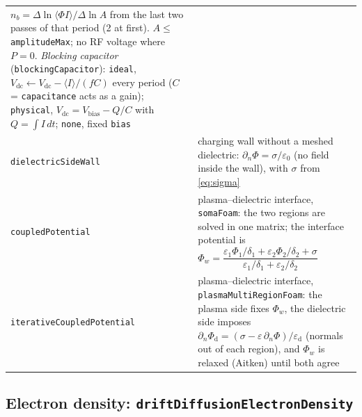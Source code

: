 \documentclass[11pt,a4paper]{article}
\newcommand{\kw}[1]{\texttt{#1}}
\begin{document}
\begin{longtable}{@{}L{4.9cm}L{10.3cm}@{}}
  $n_b=\Delta\ln\langle\Phi I\rangle/\Delta\ln A$ from the last two
  passes of that period (2 at first).
  $A\le{}$\kw{amplitudeMax}; no RF voltage where $P=0$.\newline
  \emph{Blocking capacitor} (\kw{blockingCapacitor}): \kw{ideal},
  $V_\mathrm{dc}\leftarrow V_\mathrm{dc}-\langle I\rangle/(fC)$ every period
  ($C$ = \kw{capacitance} acts as a gain); \kw{physical},
  $V_\mathrm{dc}=V_\mathrm{bias}-Q/C$ with $Q=\int I\,dt$; \kw{none},
  fixed \kw{bias} \\[3pt]
\kw{dielectricSideWall} & charging wall without a meshed dielectric:
  $\partial_n\Phi=\sigma/\varepsilon_0$ (no field inside the wall), with
  $\sigma$ from \eqref{eq:sigma} \\[3pt]
\kw{coupledPotential} & plasma--dielectric interface, \kw{somaFoam}: the two
  regions are solved in one matrix; the interface potential is
  $\Phi_w=\dfrac{\varepsilon_1\Phi_1/\delta_1+\varepsilon_2\Phi_2/\delta_2+\sigma}
  {\varepsilon_1/\delta_1+\varepsilon_2/\delta_2}$ \\[3pt]
\kw{iterativeCoupledPotential} & plasma--dielectric interface,
  \kw{plasmaMultiRegionFoam}: the plasma side fixes $\Phi_w$, the dielectric
  side imposes
  $\partial_n\Phi_\mathrm{d}=(\sigma-\varepsilon\,\partial_n\Phi)/\varepsilon_\mathrm{d}$
  (normals out of each region), and $\Phi_w$ is relaxed (Aitken) until both
  agree \\
\end{longtable}

\subsection{Electron density: \kw{driftDiffusionElectronDensity}}
\end{document}
